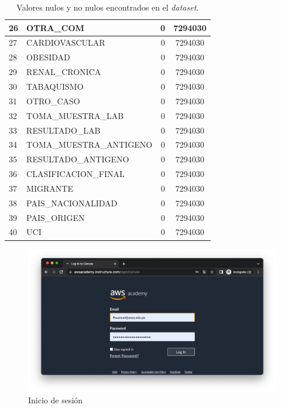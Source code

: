 \begin{table}[h]
{\begin{tabular}{|l|l|c|c|}
26 & OTRA\_COM               & 0 & 7294030 \\ \hline
27 & CARDIOVASCULAR          & 0 & 7294030 \\ \hline
28 & OBESIDAD                & 0 & 7294030 \\ \hline
29 & RENAL\_CRONICA          & 0 & 7294030 \\ \hline
30 & TABAQUISMO              & 0 & 7294030 \\ \hline
31 & OTRO\_CASO              & 0 & 7294030 \\ \hline
32 & TOMA\_MUESTRA\_LAB      & 0 & 7294030 \\ \hline
33 & RESULTADO\_LAB          & 0 & 7294030 \\ \hline
34 & TOMA\_MUESTRA\_ANTIGENO & 0 & 7294030 \\ \hline
35 & RESULTADO\_ANTIGENO     & 0 & 7294030 \\ \hline
36 & CLASIFICACION\_FINAL    & 0 & 7294030 \\ \hline
37 & MIGRANTE                & 0 & 7294030 \\ \hline
38 & PAIS\_NACIONALIDAD      & 0 & 7294030 \\ \hline
39 & PAIS\_ORIGEN            & 0 & 7294030 \\ \hline
40 & UCI                     & 0 & 7294030 \\ \hline
\end{tabular}
}
\caption{Valores nulos y no nulos encontrados en el \emph{dataset}.}
\label{tabla:isnull}
\end{table}




\clearpage
\begin{figure}[h]
	\centering
	\includegraphics[scale=.3] {img/00-login}
	\caption{Inicio de sesión}
	\label{fig:0}	
\end{figure}

